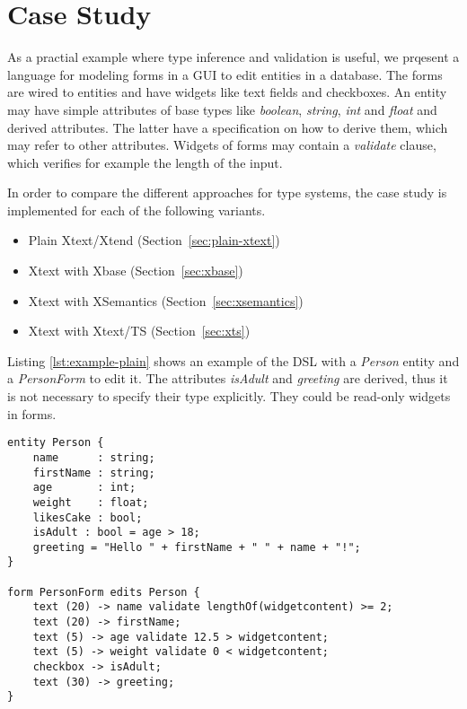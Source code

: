 \section{Case Study}
\label{sec:casestudy}

As a practial example where type inference and validation is useful, we prqesent
a language for modeling forms in a GUI to edit entities in a database. The forms
are wired to entities and have widgets like text fields and checkboxes. An
entity may have simple attributes of base types like \emph{boolean},
\emph{string}, \emph{int} and \emph{float} and derived attributes. The latter
have a specification on how to derive them, which may refer to other attributes.
Widgets of forms may contain a \emph{validate} clause, which verifies for
example the length of the input.

In order to compare the different approaches for type systems, the case study is
implemented for each of the following variants.

\begin{itemize}
\item Plain Xtext/Xtend (Section~\ref{sec:plain-xtext})
\item Xtext with Xbase (Section~\ref{sec:xbase})
\item Xtext with XSemantics (Section~\ref{sec:xsemantics})
\item Xtext with Xtext/TS (Section~\ref{sec:xts})
\end{itemize}

Listing \ref{lst:example-plain} shows an example of the DSL with a \emph{Person}
entity and a \emph{PersonForm} to edit it. The attributes \emph{isAdult} and
\emph{greeting} are derived, thus it is not necessary to specify their type
explicitly. They could be read-only widgets in forms.

%

\begin{lstlisting}[language=guidsl,label=lst:example-plain,caption=Forms
and Entities DSL.] 
entity Person {
	name      : string;
	firstName : string;
	age       : int; 
	weight    : float;
	likesCake : bool; 
	isAdult : bool = age > 18;
	greeting = "Hello " + firstName + " " + name + "!";
}

form PersonForm edits Person {
	text (20) -> name validate lengthOf(widgetcontent) >= 2;
	text (20) -> firstName;
	text (5) -> age validate 12.5 > widgetcontent;
	text (5) -> weight validate 0 < widgetcontent;
	checkbox -> isAdult;
	text (30) -> greeting;
}
\end{lstlisting}

